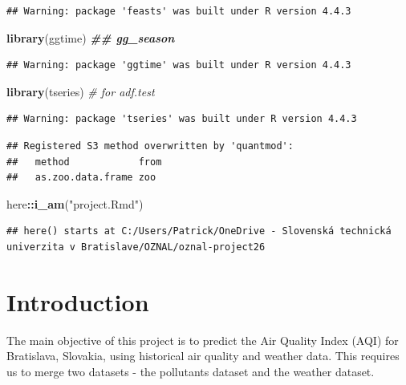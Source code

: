 \documentclass[
]{article}
\newenvironment{Shaded}{\begin{snugshade}}{\end{snugshade}}
\newcommand{\CommentTok}[1]{\textcolor[rgb]{0.56,0.35,0.01}{\textit{#1}}}
\newcommand{\DocumentationTok}[1]{\textcolor[rgb]{0.56,0.35,0.01}{\textbf{\textit{#1}}}}
\newcommand{\FunctionTok}[1]{\textcolor[rgb]{0.13,0.29,0.53}{\textbf{#1}}}
\newcommand{\NormalTok}[1]{#1}
\newcommand{\SpecialCharTok}[1]{\textcolor[rgb]{0.81,0.36,0.00}{\textbf{#1}}}
\newcommand{\StringTok}[1]{\textcolor[rgb]{0.31,0.60,0.02}{#1}}
\begin{document}
\begin{verbatim}
## Warning: package 'feasts' was built under R version 4.4.3
\end{verbatim}

\begin{Shaded}
\begin{Highlighting}[]
\FunctionTok{library}\NormalTok{(ggtime) }\DocumentationTok{\#\# gg\_season}
\end{Highlighting}
\end{Shaded}

\begin{verbatim}
## Warning: package 'ggtime' was built under R version 4.4.3
\end{verbatim}

\begin{Shaded}
\begin{Highlighting}[]
\FunctionTok{library}\NormalTok{(tseries) }\CommentTok{\# for adf.test}
\end{Highlighting}
\end{Shaded}

\begin{verbatim}
## Warning: package 'tseries' was built under R version 4.4.3
\end{verbatim}

\begin{verbatim}
## Registered S3 method overwritten by 'quantmod':
##   method            from
##   as.zoo.data.frame zoo
\end{verbatim}

\begin{Shaded}
\begin{Highlighting}[]
\NormalTok{here}\SpecialCharTok{::}\FunctionTok{i\_am}\NormalTok{(}\StringTok{"project.Rmd"}\NormalTok{)}
\end{Highlighting}
\end{Shaded}

\begin{verbatim}
## here() starts at C:/Users/Patrick/OneDrive - Slovenská technická univerzita v Bratislave/OZNAL/oznal-project26
\end{verbatim}

\section{Introduction}\label{introduction}

The main objective of this project is to predict the Air Quality Index
(AQI) for Bratislava, Slovakia, using historical air quality and weather
data. This requires us to merge two datasets - the pollutants dataset
and the weather dataset.
\end{document}

